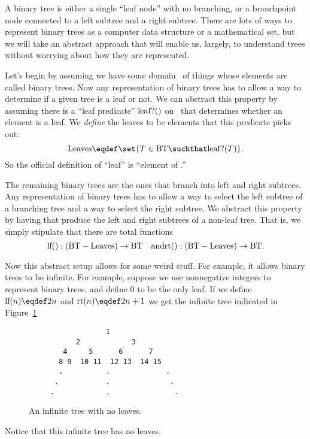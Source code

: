 A binary tree is either a single ``leaf node'' with no branching, or a
branchpoint node connected to a left subtree and a right subtree.
There are lots of ways to represent binary trees as a computer data
structure or a mathematical set, but we will take an abstract approach
that will enable us, largely, to understand trees without worrying
about how they are represented.

Let's begin by assuming we have some domain \bintree\ of things whose
elements are called binary trees.  Now any representation of binary
trees has to allow a way to determine if a given tree is a leaf or
not.  We can abstract this property by assuming there is a ``leaf
predicate'' $\text{leaf?}()$ on \bintree\ that determines whether an element
is a leaf.  We \emph{define} the leaves to be elements that this
predicate picks out:
\[
\leafset \eqdef \set{T \in \bintree \suchthat \leafp{T}}.
\]
So the official definition of ``leaf'' is ``element of \leafset.''

The remaining binary trees are the ones that branch into left and
right subtrees.  Any representation of binary trees has to allow a way
to select the left subtree of a branching tree and a way to select the
right subtree.  We abstract this property by having  that produce the left and right subtrees of a non-leaf
tree.  That is, we simply stipulate that there are total functions
\[
\text{lf}(): (\text{BT} - \text{Leaves}) \to \text{BT}\quad \text{and}
\text{rt}(): (\text{BT} - \text{Leaves}) \to \text{BT}.
\]

Now this abstract setup allows for some weird stuff.  For example, it
allows binary trees to be infinite.  For example, suppose we use
nonnegative integers to represent binary trees, and define 0 to be the
only leaf.  If we define $\leftsub{n} \eqdef 2n$ and $\rightsub{n}
\eqdef 2n+1$ we get the infinite tree indicated in
Figure~\ref{inftree123}

\begin{figure}


\begin{verbatim}
                  1
           2            3
        4     5      6      7
       8 9  10 11  12 13  14 15
       .          .             . 
      .           .              .
     .            .               . 

\end{verbatim}

\caption{An infinite tree with no leaves.}

\label{inftree123}

\end{figure}
Notice that this infinite tree has no leaves.  

